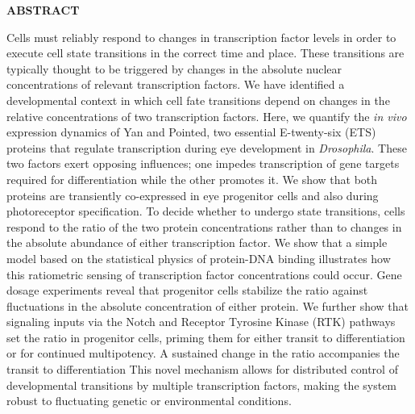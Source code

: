 

\textbf{ABSTRACT}

Cells must reliably respond to changes in transcription factor levels in order to execute cell state transitions in the correct time and place. These transitions are typically thought to be triggered by changes in the absolute nuclear concentrations of relevant transcription factors. We have identified a developmental context in which cell fate transitions depend on changes in the relative concentrations of two transcription factors. Here, we quantify the \emph{in vivo} expression dynamics of Yan and Pointed, two essential E-twenty-six (ETS) proteins that regulate transcription during eye development in \emph{Drosophila}. These two factors exert opposing influences; one impedes transcription of gene targets required for differentiation while the other promotes it. We show that both proteins are transiently co-expressed in eye progenitor cells and also during photoreceptor specification. To decide whether to undergo state transitions, cells respond to the ratio of the two protein concentrations rather than to changes in the absolute abundance of either transcription factor. We show that a simple model based on the statistical physics of protein-DNA binding illustrates how this ratiometric sensing of transcription factor concentrations could occur. Gene dosage experiments reveal that progenitor cells stabilize the ratio against fluctuations in the absolute concentration of either protein. We further show that signaling inputs via the Notch and Receptor Tyrosine Kinase (RTK) pathways set the ratio in progenitor cells, priming them for either transit to differentiation or for continued multipotency. A sustained change in the ratio accompanies the transit to differentiation This novel mechanism allows for distributed control of developmental transitions by multiple transcription factors, making the system robust to fluctuating genetic or environmental conditions.


